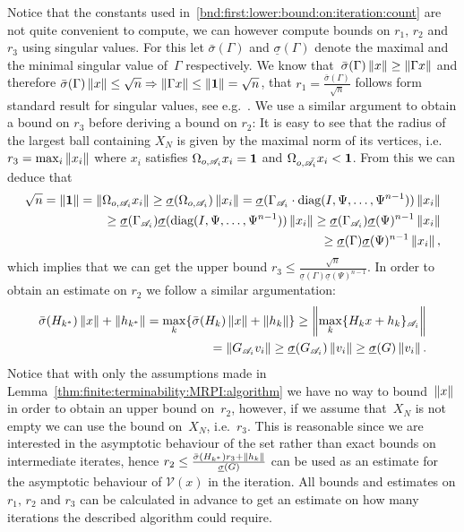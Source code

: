 %
Notice that the constants used in~\eqref{bnd:first:lower:bound:on:iteration:count} are not
quite convenient to compute, we can however compute bounds on $r_1,\, r_2$ and $r_3$ using 
singular values.
%
For this let $\bar\sigma(\Gamma)$ and $\underline\sigma(\Gamma)$ denote the maximal and the minimal
singular value of~$\Gamma$ respectively.
%
We know that~$\bar\sigma(\Gamma)\left\|x\right\|\geq\left\|\Gamma x\right\|$ and therefore $\bar\sigma(\Gamma)\left\|x\right\|
\leq \sqrt{n}\Rightarrow \left\|\Gamma x\right\|\leq\left\|\bf{1}\right\|=\sqrt{n}$, that $r_1=\frac{\bar\sigma(\Gamma)}{\sqrt{n}}$
follows form standard result for singular values, see e.g.~\cite{Golub:1996}.
%
We use a similar argument to obtain a bound on $r_3$ before deriving a bound on $r_2$:
%
It is easy to see that the radius of the largest ball containing $X_N$ is given by the maximal
norm of its vertices, i.e. $r_3=\max_{i}\left\|x_i\right\|$ where $x_i$ satisfies $\Omega_{o,\mathscr{A}_i} x_i={\bf{1}}$
and $\Omega_{o,\bar{\mathscr A}_i}x_i<{\bf{1}}$.
%
From this we can deduce that
%
\begin{equation}\begin{split}
	\sqrt{n}=\left\|\bf{1}\right\|=\left\|\Omega_{o,\mathscr{A}_i}x_i\right\|\geq\underline\sigma(\Omega_{o,\mathscr{A}_i})\left\|x_i\right\|
	=\underline\sigma(\Gamma_{\mathscr{A}_i}\cdot \text{diag}(I,\Psi,\dots,\Psi^{n-1}))\left\|x_i\right\|\\
	\geq\underline\sigma(\Gamma_{\mathscr{A}_i})\underline\sigma( \text{diag}(I,\Psi,\dots,\Psi^{n-1}))\left\|x_i\right\|
	\geq\underline\sigma(\Gamma_{\mathscr{A}_i})\underline\sigma(\Psi)^{n-1}\left\|x_i\right\|\\
	\geq\underline\sigma(\Gamma)\underline\sigma(\Psi)^{n-1}\left\|x_i\right\|,
\end{split}\end{equation}
%
which implies that we can get the upper bound $r_3\leq\frac{\sqrt{n}}{\underline\sigma(\Gamma)
\underline\sigma(\Psi)^{n-1}}$.
%
In order to obtain an estimate on $r_2$ we follow a similar argumentation:
%
\begin{equation}\begin{split}
	\bar\sigma(H_{k^\ast})\left\|x\right\|+\left\|h_{k^\ast}\right\|=\max_k\{\bar\sigma(H_k)\left\|x\right\|+\left\|h_k\right\|\}\geq
	\left\|\max_k\{H_k x + h_k\}_{\mathscr{A}_i}\right\|\\ 
	=\left\|G_{\mathscr{A}_i}v_i\right\| \geq\underline\sigma(G_{\mathscr A_i})\left\|v_i\right\|
	\geq\underline\sigma(G)\left\|v_i\right\|.
\end{split}\end{equation}
%
Notice that with only the assumptions made in Lemma~\ref{thm:finite:terminability:MRPI:algorithm}
we have no way to bound~$\left\|x\right\|$ in order to obtain an upper bound on~$r_2$,
however, if we assume that~$X_N$ is not empty we can use the bound on~$X_N$, i.e.~$r_3$.
%
This is reasonable since we are interested in the asymptotic behaviour of the set rather than
exact bounds on intermediate iterates, hence $r_2\leq\frac{\bar\sigma(H_{k^\ast})r_3+\left\|h_k\right\|}
{\underline\sigma(G)}$ can be used as an estimate for the asymptotic behaviour of $\mathcal V(x)$
in the iteration.
%
All bounds and estimates on $r_1,\,r_2$ and $r_3$ can be calculated in advance to get an estimate
on how many iterations the described algorithm could require.
%
%
%
%
%
